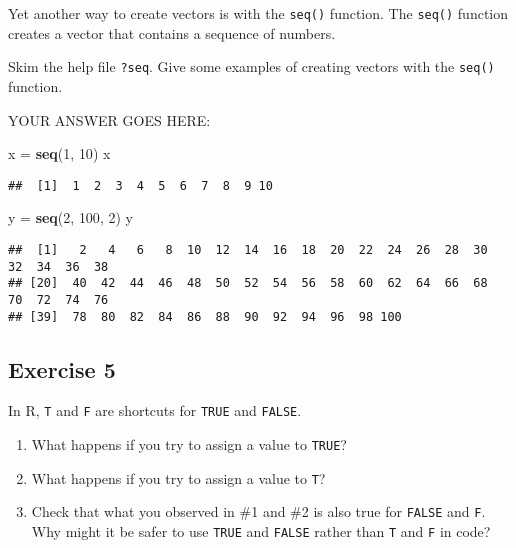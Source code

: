 \documentclass[
]{article}
\newenvironment{Shaded}{\begin{snugshade}}{\end{snugshade}}
\newcommand{\DecValTok}[1]{\textcolor[rgb]{0.00,0.00,0.81}{#1}}
\newcommand{\KeywordTok}[1]{\textcolor[rgb]{0.13,0.29,0.53}{\textbf{#1}}}
\newcommand{\NormalTok}[1]{#1}
\newcommand{\StringTok}[1]{\textcolor[rgb]{0.31,0.60,0.02}{#1}}
\begin{document}
Yet another way to create vectors is with the \texttt{seq()} function.
The \texttt{seq()} function creates a vector that contains a sequence of
numbers.

Skim the help file \texttt{?seq}. Give some examples of creating vectors
with the \texttt{seq()} function.

YOUR ANSWER GOES HERE:

\begin{Shaded}
\begin{Highlighting}[]
\NormalTok{x =}\StringTok{ }\KeywordTok{seq}\NormalTok{(}\DecValTok{1}\NormalTok{, }\DecValTok{10}\NormalTok{)}
\NormalTok{x}
\end{Highlighting}
\end{Shaded}

\begin{verbatim}
##  [1]  1  2  3  4  5  6  7  8  9 10
\end{verbatim}

\begin{Shaded}
\begin{Highlighting}[]
\NormalTok{y =}\StringTok{ }\KeywordTok{seq}\NormalTok{(}\DecValTok{2}\NormalTok{, }\DecValTok{100}\NormalTok{, }\DecValTok{2}\NormalTok{)}
\NormalTok{y}
\end{Highlighting}
\end{Shaded}

\begin{verbatim}
##  [1]   2   4   6   8  10  12  14  16  18  20  22  24  26  28  30  32  34  36  38
## [20]  40  42  44  46  48  50  52  54  56  58  60  62  64  66  68  70  72  74  76
## [39]  78  80  82  84  86  88  90  92  94  96  98 100
\end{verbatim}

\hypertarget{exercise-5}{%
\subsection{Exercise 5}\label{exercise-5}}

In R, \texttt{T} and \texttt{F} are shortcuts for \texttt{TRUE} and
\texttt{FALSE}.

\begin{enumerate}
\def\labelenumi{\arabic{enumi}.}
\item
  What happens if you try to assign a value to \texttt{TRUE}?
\item
  What happens if you try to assign a value to \texttt{T}?
\item
  Check that what you observed in \#1 and \#2 is also true for
  \texttt{FALSE} and \texttt{F}. Why might it be safer to use
  \texttt{TRUE} and \texttt{FALSE} rather than \texttt{T} and \texttt{F}
  in code?
\end{enumerate}
\end{document}
